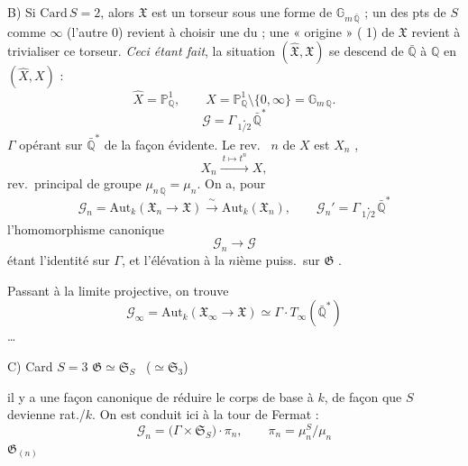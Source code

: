 \documentclass[11pt,a4paper]{article}
\begin{document}
B) Si $\mathrm{Card}\, S = 2$, alors $\mathfrak{X}$ est  un torseur sous une forme de $\mathbb{G}_{m\,\bar{\mathbb{Q}}}$ ;  un des pts de $S$ comme $\infty$ (l'autre  $0$) revient à choisir une \uncertain{\ill{}} du  \ill{} ;   une « origine » ( 1) de $\mathfrak{X}$ revient à trivialiser ce torseur. \emph{Ceci étant fait}, \struck{\ill{}} la situation $(\hat{\mathfrak{X}}, \mathfrak{X})$ se descend de $\bar{\mathbb{Q}}$ à $\mathbb{Q}$ en $(\hat{X}, X)$ :
\[
  \hat{X} = \mathbb{P}^1_{\mathbb{Q}}, \qquad
  X = \mathbb{P}^1_{\mathbb{Q}} \setminus \{0,\infty\} = \mathbb{G}_{m\,\mathbb{Q}} .
\]
 \ill{}
\[
  \mathcal{G} = \Gamma \underset{1/2}{\cdot} \bar{\mathbb{Q}}^{*}
\]
$\Gamma$ opérant sur $\bar{\mathbb{Q}}^{*}$ de la façon évidente. Le rev.\   $n$ de $X$ est $X_n$ ,
\[
  X_n \xrightarrow{\ t \mapsto t^n\ } X ,
\]
rev.\ principal de groupe $\mu_{n\,\mathbb{Q}} = \mu_n$.
On a, pour
\[
  \mathcal{G}_n = \mathrm{Aut}_k(\mathfrak{X}_n \to \mathfrak{X}) \xrightarrow{\ \sim\ } \mathrm{Aut}_k(\mathfrak{X}_n) ,
  \qquad
  \mathcal{G}_n' = \Gamma \underset{1/2}{\cdot} \bar{\mathbb{Q}}^{*}
\]
l'homomorphisme canonique
\[
  \mathcal{G}_n \longrightarrow \mathcal{G}
\]
étant l'identité sur \struck{\ill{}} $\Gamma$, et l'élévation à la $n$ième puiss.\ sur $\mathfrak{G}$ .

Passant à la limite projective, on trouve
\[
  \mathcal{G}_\infty = \mathrm{Aut}_k(\mathfrak{X}_\infty \to \mathfrak{X}) \simeq \Gamma \cdot T_\infty(\bar{\mathbb{Q}}^{*})
\]
\ldots

C) Card $S = 3$ \qquad $\mathfrak{G} \simeq \mathfrak{S}_S$ \ ($\simeq \mathfrak{S}_3$)

il y a une façon canonique de réduire le corps de base à $k$, de façon que $S$ devienne rat./$k$. On est conduit ici à la tour de Fermat :
\[
  \mathcal{G}_n = \bigl(\Gamma \times \mathfrak{S}_S\bigr) \cdot \pi_n ,
  \qquad \pi_n = \mu_n^{S}/\mu_n
\]
\struck{\ill{}} \struck{\ill{}} $\mathfrak{G}_{(n)}$
\end{document}
